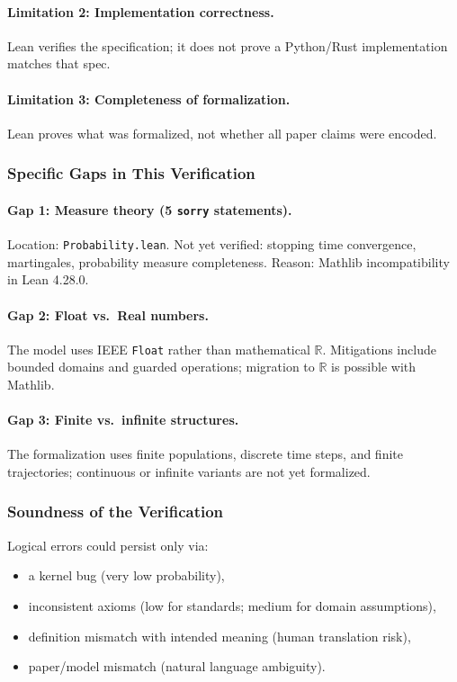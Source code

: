 \paragraph{Limitation 2: Implementation correctness.}
Lean verifies the specification; it does not prove a Python/Rust implementation matches that spec.

\paragraph{Limitation 3: Completeness of formalization.}
Lean proves what was formalized, not whether all paper claims were encoded.

\subsubsection{Specific Gaps in This Verification}

\paragraph{Gap 1: Measure theory (5 \texttt{sorry} statements).}
Location: \texttt{Probability.lean}. Not yet verified: stopping time convergence, martingales, probability measure completeness. Reason: Mathlib incompatibility in Lean 4.28.0.

\paragraph{Gap 2: Float vs.\ Real numbers.}
The model uses IEEE \texttt{Float} rather than mathematical $\mathbb{R}$. Mitigations include bounded domains and guarded operations; migration to $\mathbb{R}$ is possible with Mathlib.

\paragraph{Gap 3: Finite vs.\ infinite structures.}
The formalization uses finite populations, discrete time steps, and finite trajectories; continuous or infinite variants are not yet formalized.

\subsubsection{Soundness of the Verification}
Logical errors could persist only via:
\begin{itemize}
  \item a kernel bug (very low probability),
  \item inconsistent axioms (low for standards; medium for domain assumptions),
  \item definition mismatch with intended meaning (human translation risk),
  \item paper/model mismatch (natural language ambiguity).
\end{itemize}

